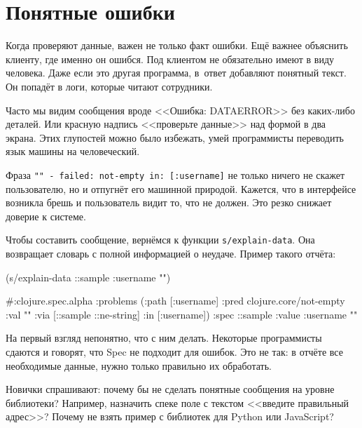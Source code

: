 \section{Понятные ошибки}


\label{spec-messages}

Когда проверяют данные, важен не только факт ошибки. Ещё важнее объяснить
клиенту, где именно он ошибся. Под клиентом не обязательно имеют в виду
человека. Даже если это другая программа, в~ответ добавляют понятный текст. Он
попадёт в логи, которые читают сотрудники.

Часто мы видим сообщения вроде <<Ошибка: DATAERROR>> без каких-либо деталей. Или
красную надпись <<проверьте данные>> над формой в два экрана. Этих глупостей
можно было избежать, умей программисты переводить язык машины на человеческий.


Фраза \texttt{"" - failed: not-empty in: [:user\-name]} не только ничего не скажет
пользователю, но и отпугнёт его машинной природой. Кажется, что в интерфейсе
возникла брешь и пользователь видит то, что не должен. Это резко снижает
доверие к системе.

Чтобы составить сообщение, вернёмся к функции \verb|s/explain-data|. Она
возвращает словарь с полной информацией о неудаче. Пример такого отчёта:

\begin{english}
  \begin{clojure}
(s/explain-data ::sample {:username ""})

#:clojure.spec.alpha
{:problems
 ({:path [:username]
   :pred clojure.core/not-empty
   :val ""
   :via [::sample ::ne-string]
   :in [:username]})
 :spec ::sample
 :value {:username ""}}
  \end{clojure}
\end{english}


На первый взгляд непонятно, что с ним делать. Некоторые программисты сдаются и
говорят, что Spec не подходит для ошибок. Это не так: в отчёте все
необходимые данные, нужно только правильно их обработать.

Новички спрашивают: почему бы не сделать понятные сообщения на уровне
библиотеки? Например, назначить спеке поле с текстом <<введите правильный
адрес>>? Почему не взять пример с библиотек для Python или JavaScript?

